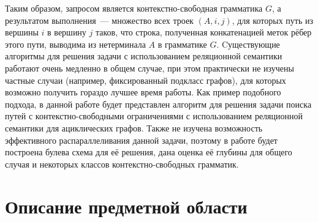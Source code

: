  Таким образом, запросом является контекстно-свободная грамматика $G$, а результатом выполнения~--- множество всех троек
$(A, i, j)$, для которых путь из вершины $i$ в вершину $j$ таков, что строка, полученная конкатенацией меток рёбер этого пути, выводима из нетерминала $A$ в грамматике $G$. Cуществующие алгоритмы для решения задачи с использованием реляционной семантики работают очень медленно в общем случае, при этом практически не изучены частные случаи (например, фиксированный подкласс графов), для которых возможно получить гораздо лучшее время работы. Как пример подобного подхода, в данной работе будет представлен алгоритм для решения задачи поиска путей с контекстно-свободными ограничениями с использованием реляционной семантики для ациклических графов. Также не изучена возможность эффективного распараллеливания данной задачи, поэтому в работе будет построена булева схема для её решения, дана оценка её глубины для общего случая и некоторых классов контекстно-свободных грамматик.


\section{Описание предметной области}
